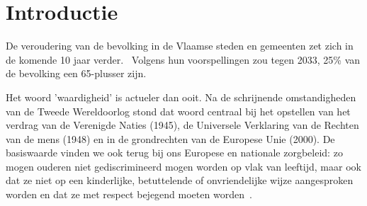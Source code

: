 

\section{Introductie}\label{sec:introductie} %

De veroudering van de bevolking in de Vlaamse steden en gemeenten zet zich in de komende 10 jaar verder.~\autocite{StatistiekVlaanderen2018}
Volgens hun voorspellingen zou tegen 2033, 25\% van de bevolking een 65-plusser zijn.

Het woord 'waardigheid' is actueler dan ooit.
Na de schrijnende omstandigheden van de Tweede Wereldoorlog stond dat woord centraal bij het opstellen van het verdrag van de Verenigde Naties (1945), de Universele Verklaring van de Rechten van de mens (1948) en in de grondrechten van de Europese Unie (2000).
De basiswaarde vinden we ook terug bij ons Europese en nationale zorgbeleid: zo mogen ouderen niet gediscrimineerd mogen worden op vlak van leeftijd, maar ook dat ze niet op een kinderlijke, betuttelende of onvriendelijke wijze aangesproken worden en dat ze met respect bejegend moeten worden~\autocite{Campens}.

